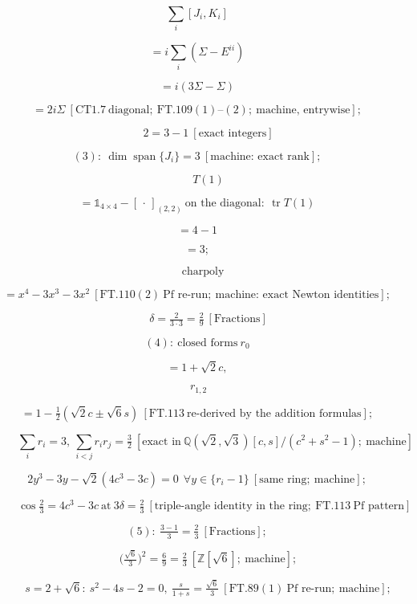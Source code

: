 \begin{theorem}
\[
\textstyle\sum_i[J_i,K_i]
\]

\[
= i\sum_i(\Sigma-E^{ii})
\]

\[
= i(3\Sigma-\Sigma)
\]

\[
= 2i\Sigma\ [\mathrm{CT1.7}\ \text{diagonal};\ \mathrm{FT.109}(1)\text{–}(2);\ \text{machine, entrywise}];
\]

\[
\qquad 2=3-1\ [\text{exact integers}]
\]

\[
(3):\ \dim\operatorname{span}\{J_i\}=3\ [\text{machine: exact rank}];
\]

\[
\qquad T(1)
\]

\[
= \mathbb 1_{4\times4}-[\,\cdot\,]_{(2,2)}\ \text{on the diagonal}:\ \operatorname{tr}T(1)
\]

\[
= 4-1
\]

\[
= 3;
\]

\[
\quad\operatorname{charpoly}
\]

\[
= x^4-3x^3-3x^2\ [\mathrm{FT.110}(2)\ \text{Pf re-run};\ \text{machine: exact Newton identities}];
\]

\[
\qquad \delta=\tfrac{2}{3\cdot3}=\tfrac29\ [\text{Fractions}]
\]

\[
(4):\ \text{closed forms}\ r_0
\]

\[
= 1+\sqrt2 c,
\]

\[
\ r_{1,2}
\]

\[
= 1-\tfrac12(\sqrt2 c\pm\sqrt6 s)\ [\mathrm{FT.113}\ \text{re-derived by the addition formulas}];
\]

\[
\qquad \sum_ir_i=3,\ \sum_{i<j}r_ir_j=\tfrac32\ [\text{exact in}\ \mathbb Q(\sqrt2,\sqrt3)[c,s]/(c^2{+}s^2{-}1);\ \text{machine}]
\]

\[
2y^3-3y-\sqrt2(4c^3-3c)=0\ \ \forall y\in\{r_i-1\}\ [\text{same ring};\ \text{machine}];
\]

\[
\qquad \cos\tfrac23=4c^3-3c\ \text{at}\ 3\delta=\tfrac23\ [\text{triple-angle identity in the ring};\ \mathrm{FT.113}\ \text{Pf pattern}]
\]

\[
(5):\ \tfrac{3-1}3=\tfrac23\ [\text{Fractions}];
\]

\[
\qquad \bigl(\tfrac{\sqrt6}3\bigr)^2=\tfrac69=\tfrac23\ [\mathbb Z[\sqrt6];\ \text{machine}];
\]

\[
\qquad s=2+\sqrt6:\ s^2-4s-2=0,\ \tfrac{s}{1+s}=\tfrac{\sqrt6}3\ [\mathrm{FT.89}(1)\ \text{Pf re-run};\ \text{machine}];
\]


\end{theorem}
